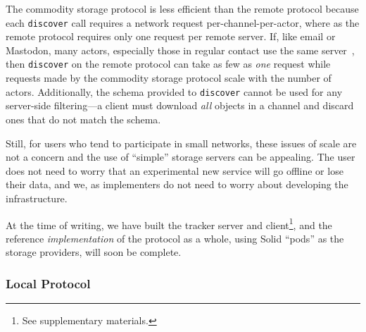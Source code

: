 The commodity storage protocol is less efficient than the remote protocol because each
\texttt{discover} call requires a network request per-channel-per-actor,
where as the remote protocol requires only one request per remote server.
If, like email or Mastodon, many actors, especially those in regular contact
use the same server~\cite{mastodonchallenges},
then \texttt{discover} on the remote protocol can take as
few as \emph{one} request while requests made by
the commodity storage protocol scale with the number of actors.
Additionally, the schema provided to \texttt{discover} cannot be used for any
server-side filtering---a client must download \emph{all} objects in a channel
and discard ones that do not match the schema.

Still, for users who tend to participate in small networks, these issues
of scale are not a concern and the use of ``simple'' storage servers can be appealing.
The user does not need to worry that an experimental new service
will go offline or lose their data, and we, as implementers do not need to
worry about developing the infrastructure.

At the time of writing, we have built the tracker server and client\footnote{
  See supplementary materials.
}, and the reference \emph{implementation} of the protocol as a whole,
using Solid ``pods'' as the storage providers,
will soon be complete.


\subsubsection{Local Protocol}

